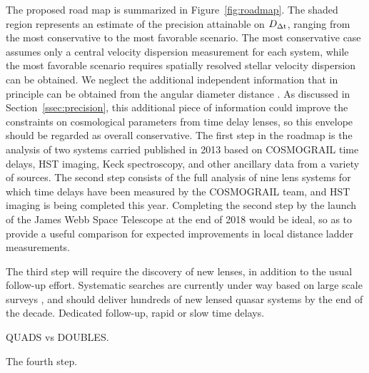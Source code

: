 The proposed road map is summarized in Figure~\ref{fig:roadmap}. The
shaded region represents an estimate of the precision attainable on
$D_{\Delta{\rm t}}$, ranging from the most conservative to the most favorable
scenario. The most conservative case assumes only a central velocity
dispersion measurement for each system, while the most favorable
scenario requires spatially resolved stellar velocity dispersion can
be obtained. We neglect the additional independent information that in
principle can be obtained from the angular diameter distance
\citep{JeeKomatsuSuyu2015,JeeEtal2016}.  As discussed in
Section~\ref{ssec:precision}, this additional piece of information
could improve the constraints on cosmological parameters from time
delay lenses, so this envelope should be regarded as overall
conservative. The first step in the roadmap is the analysis of two
systems carried published in 2013 based on COSMOGRAIL time delays, HST
imaging, Keck spectroscopy, and other ancillary data from a variety of
sources. The second step consists of the full analysis of nine lens
systems for which time delays have been measured by the COSMOGRAIL
team, and HST imaging is being completed this year. Completing the
second step by the launch of the James Webb Space Telescope at the end
of 2018 would be ideal, so as to provide a useful comparison for
expected improvements in local distance ladder measurements.

The third step will require the discovery of new lenses, in addition
to the usual follow-up effort. Systematic searches are currently under
way based on large scale surveys \citep{Agn++15,Mor++16}, and should
deliver hundreds of new lensed quasar systems
\citep{O+M10} by the end of the decade.
Dedicated follow-up, rapid or slow time delays.

QUADS vs DOUBLES.

The fourth step.

